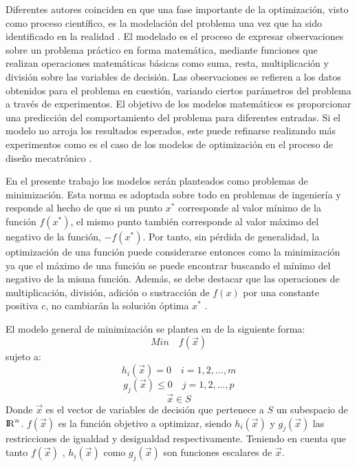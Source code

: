 Diferentes autores coinciden en que una fase importante de la optimización, visto como proceso científico, es la modelación del problema una vez que ha sido identificado en la realidad \cite{rao_engineering_2009} \cite{nocedal2006numerical} \cite{luenberger_linear_2015}. El modelado es el proceso de expresar observaciones sobre un problema práctico en forma matemática, mediante funciones que realizan operaciones matemáticas básicas como suma, resta, multiplicación y división sobre las variables de decisión. Las observaciones se refieren a los datos obtenidos para el problema en cuestión, variando ciertos parámetros del problema a través de experimentos. El objetivo de los modelos matemáticos es proporcionar una predicción del comportamiento del problema para diferentes entradas. Si el modelo no arroja los resultados esperados, este puede refinarse realizando más experimentos como es el caso de los modelos de optimización en el proceso de diseño mecatrónico \cite{arora_optimization:_2015}.  

En el presente trabajo los modelos serán planteados como problemas de minimización. Esta norma es adoptada sobre todo en problemas de ingeniería y responde al hecho de que si un punto $x^*$ corresponde al valor mínimo de la función $f(x^*)$, el mismo punto también corresponde al valor máximo del negativo de la función, $-f(x^*)$. Por tanto, sin pérdida de generalidad, la optimización de una función puede considerarse entonces como la minimización ya que el máximo de una función se puede encontrar buscando el mínimo del negativo de la misma función. Además, se debe destacar que las operaciones de multiplicación, división, adición o sustracción de $f(x)$ por una constante positiva $c$, no cambiarán la solución óptima $x^*$ \cite{rao_engineering_2009}. 

El modelo general de minimización se plantea en \cite{luenberger_linear_2015} de la siguiente forma:
\begin{equation}
Min\quad  f(\vec{x})
\end{equation}
sujeto a:
\begin{equation}
h_{i}(\vec{x})=0 \quad i=1,2,...,m
\end{equation}
\begin{equation}
g_{j}(\vec{x}) \leq 0 \quad j=1,2,...,p 
\end{equation}
\begin{equation}
	\vec{x} \in S
\end{equation}
Donde $\vec{x}$ es el vector de variables de decisión que pertenece a $S$ un subespacio de ${\rm I\!R}^{n}$. $f(\vec{x})$  es la función objetivo a optimizar, siendo $h_{i}(\vec{x})$ y $g_{j}(\vec{x})$ las restricciones de igualdad y desigualdad respectivamente. Teniendo en cuenta que tanto $f(\vec{x})$ , $h_{i}(\vec{x})$ como $g_{j}(\vec{x})$ son funciones escalares de $\vec{x}$. 
